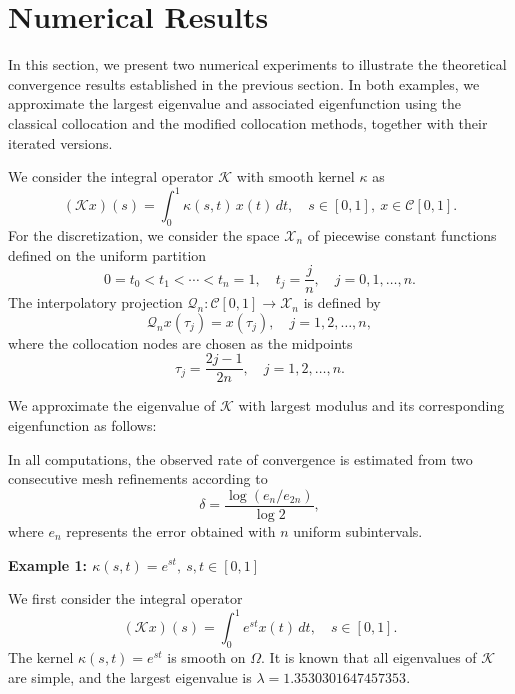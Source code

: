 \documentclass[]{interact}
\theoremstyle{plain}%
\theoremstyle{definition}
\theoremstyle{remark}
\begin{document}

\section{Numerical Results}

In this section, we present two numerical experiments to illustrate the theoretical convergence results established in the previous section. In both examples, we approximate the largest eigenvalue and associated eigenfunction using the classical collocation and the modified collocation methods, together with their iterated versions.

We consider the integral operator $\mathcal{K}$ with smooth kernel $\kappa$ as
\[
(\mathcal{K}x)(s) = \int_{0}^{1} \kappa(s,t)\, x(t) \, dt, \quad s \in [0, 1],~ x \in \mathcal{C}[0,1].
\]
For the discretization, we consider the space $\mathcal{X}_n$ of piecewise constant functions defined on the uniform partition
\[
0 = t_0 < t_1 < \cdots < t_n = 1,
\quad
t_j = \frac{j}{n}, \quad j=0,1,\dots,n.
\]
The interpolatory projection $\mathcal{Q}_n : \mathcal{C}[0,1] \to \mathcal{X}_n$
is defined by \[
\mathcal{Q}_nx(\tau_j) = x(\tau_j), \quad j = 1, 2, \ldots, n,
\]
where the collocation nodes are chosen as the midpoints
\[
\tau_j = \frac{2j - 1}{2n}, \quad j = 1, 2, \ldots, n.
\]

We approximate the eigenvalue of $\mathcal{K}$ with largest modulus 
and its corresponding eigenfunction as follows: 

\noindent
In all computations, the observed rate of convergence is estimated from two consecutive mesh refinements according to
\[
\delta = \frac{\log(e_n/e_{2n})}{\log 2},
\]
where $e_n$ represents the error obtained with $n$ uniform subintervals.


\vspace*{0.1in}
\noindent
\textbf{Example 1:  $\kappa(s,t)=e^{st}, ~ s,t \in[0,1]$}

\noindent
We first consider the integral operator
\[
(\mathcal{K}x)(s)
=
\int_0^1 e^{st} x(t)\,dt,
\quad s\in[0,1].
\]
The kernel $\kappa(s,t)=e^{st}$ is smooth on $\Omega$. It is known that all eigenvalues of $\mathcal{K}$ are simple, and the largest eigenvalue is $\lambda = 1.3530301647457353.$
\end{document}
